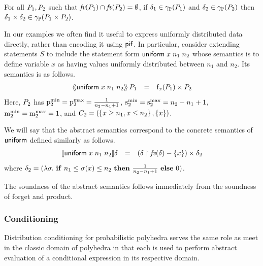 \begin{lemma}
\label{lem:pp:product}
For all $P_{1}, P_{2}$ such that $\textit{fv}(P_{1}) \cap
\textit{fv}(P_{2}) = \emptyset$, if $\delta_1 \in \gamma_{\mathbb{P}}(P_{1})$ and
$\delta_2 \in \gamma_{\mathbb{P}}(P_{2})$ then $\delta_1 \times \delta_2
\in \gamma_{\mathbb{P}}(P_{1} \times P_{2})$. 
\end{lemma}

In our examples we often find it useful to express uniformly distributed
data directly, rather than encoding it using $\mathsf{pif}$.  In particular,
consider extending statements $S$ to include the statement form
$\mathsf{uniform}\;{x}\;{n_1}\;n_2$ whose semantics is to define variable $x$ as
having values uniformly distributed between $n_1$ and $n_2$.
Its semantics is as follows.
$$
\begin{array}{rcl}
\langle\!\langle{\mathsf{uniform}\;{x}\;{n_1}\;n_2}\rangle\!\rangle\,{P_{1}} & = & \mathrm{f}_{x}(P_{1})
\times P_{2}
\end{array}
$$
Here, $ P_{2} $ has $ \mathrm{p}^\mathrm{min}_{2} = \mathrm{p}^\mathrm{max}_{2} = \frac{1}{n_2 - n_1 + 1}
$, $ \mathrm{s}^\mathrm{min}_{2} = \mathrm{s}^\mathrm{max}_{2} = n_2 - n_1 + 1 $, $ \mathrm{m}^\mathrm{min}_{2} = \mathrm{m}^\mathrm{max}_{2} = 1
$, and $ C_2 = (\left\{ x \geq n_1, x \leq n_2 \right\}, \left\{ x \right\}) $.

We will say that the abstract semantics correspond to the concrete
semantics of $ \mathsf{uniform} $ defined similarly as follows.
$$
\begin{array}{rcl}
[\![{\mathsf{uniform}\;{x}\;{n_1}\;n_2}]\!]{\delta} & = &
\left( \delta \upharpoonright \textit{fv}(\delta) - \left\{ x \right\} \right) \times \delta_2
\end{array}
$$
where $ \delta_2 = (\lambda \sigma. \text{ \textbf{if} } n_1 \leq \sigma(x)
\leq n_2 \text{ \textbf{then} } \frac{1}{n_2 - n_1 + 1} \text{ \textbf{else} } 0)$.

The soundness of the abstract semantics follows immediately from the
soundness of forget and product.

\subsubsection{Conditioning}

\newcommand{\nn}{\overline{n}} 
\newcommand{\nnu}{\underline{n}} 

Distribution conditioning for probabilistic polyhedra serves the same
role as meet in the classic domain of polyhedra in that each is used
to perform abstract evaluation of a conditional expression in its
respective domain.

